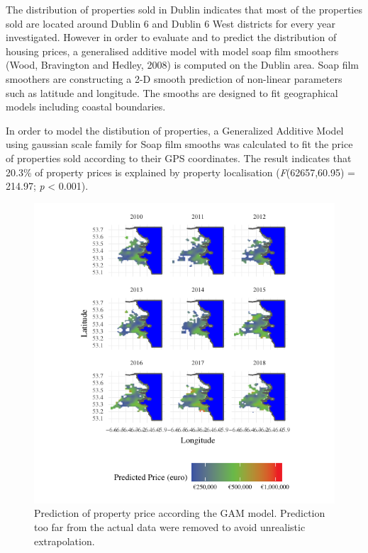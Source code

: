 \documentclass[]{elsarticle} %
\begin{document}
The distribution of properties sold in Dublin indicates that most of the
properties sold are located around Dublin 6 and Dublin 6 West districts
for every year investigated. However in order to evaluate and to predict
the distribution of housing prices, a generalised additive model with
model soap film smoothers (Wood, Bravington and Hedley, 2008) is
computed on the Dublin area. Soap film smoothers are constructing a 2-D
smooth prediction of non-linear parameters such as latitude and
longitude. The smooths are designed to fit geographical models including
coastal boundaries.

In order to model the distibution of properties, a Generalized Additive
Model using gaussian scale family for Soap film smooths was calculated
to fit the price of properties sold according to their GPS coordinates.
The result indicates that 20.3\% of property prices is explained by
property localisation (\emph{F}(62657,60.95) = 214.97; \emph{p}
\textless{} 0.001).

\begin{figure}[H]
\includegraphics{property_price_paper_new_files/figure-latex/gam-plot-1} \caption{Prediction of property price according the GAM model. Prediction too far from the actual data were removed to avoid unrealistic extrapolation.}\label{fig:gam-plot}
\end{figure}
\end{document}
